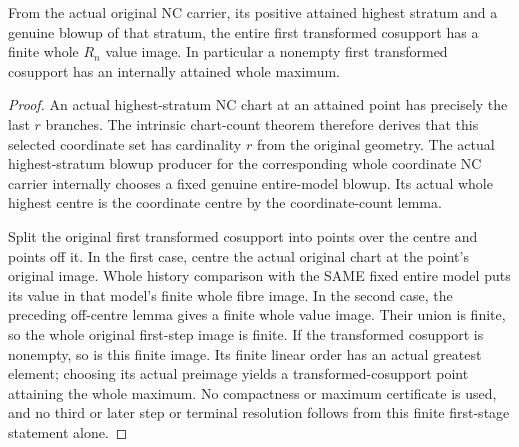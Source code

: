 \begin{theorem}
\label{hir:general-nc-first-step-finite-entire-whole-values}
\leanok
{}
From the actual original NC carrier, its positive attained highest
stratum and a genuine blowup of that stratum, the entire first transformed
cosupport has a finite whole $R_n$ value image. In particular a nonempty
first transformed cosupport has an internally attained whole maximum.
\end{theorem}
\begin{proof}
An actual highest-stratum NC chart at an attained point has precisely
the last $r$ branches. The intrinsic chart-count theorem therefore
derives that this selected coordinate set has cardinality $r$ from the
original geometry. The actual highest-stratum blowup producer for the
corresponding whole coordinate NC carrier internally chooses a fixed
genuine entire-model blowup. Its actual whole highest centre is the
coordinate centre by the coordinate-count lemma.

Split the original first transformed cosupport into points over the
centre and points off it. In the first case, centre the actual original
chart at the point's original image. Whole history comparison with the
SAME fixed entire model puts its value in that model's finite whole
fibre image. In the second case, the preceding off-centre lemma gives
a finite whole value image. Their union is finite, so the whole original
first-step image is finite. If the transformed cosupport is nonempty,
so is this finite image. Its finite linear order has an actual greatest
element; choosing its actual preimage yields a transformed-cosupport
point attaining the whole maximum. No compactness or maximum certificate
is used, and no third or later step or terminal resolution follows
from this finite first-stage statement alone.
\end{proof}

